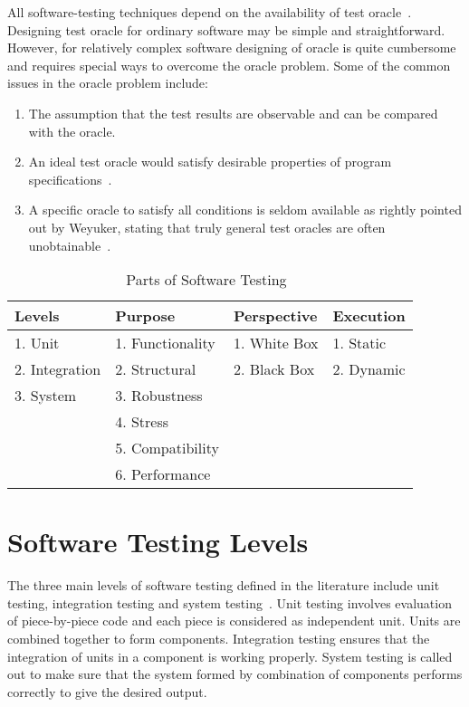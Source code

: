 {All software-testing techniques depend on the availability of test oracle~\cite{gaudel2010software}. Designing test oracle for ordinary software may be simple and straightforward. However, for relatively complex software designing of oracle is quite cumbersome and requires special ways to overcome the oracle problem. Some of the common issues in the oracle problem include:
\begin{enumerate}
\item The assumption that the test results are observable and can be compared with the oracle.
\item An ideal test oracle would satisfy desirable properties of program specifications~\cite{baresi2001test}.
\item A specific oracle to satisfy all conditions is seldom available as rightly pointed out by Weyuker, stating that truly general test oracles are often unobtainable~\cite{weyuker1982testing}. 
\end{enumerate}


\begin{table}[ht]
\caption{Parts of Software Testing~\cite{adrion1982validation, chilenski1994applicability, gaudel2010software, richardson1992specification, tracey1998automated}} %
\smallskip
\centering %
\begin{tabular}{| l | l | l | l | } %
\hline

Levels 					&Purpose		 				& Perspective			& Execution 	\\
\hline
1. Unit					&1. Functionality		& 1. White Box		& 1. Static 	\\
2. Integration	&2. Structural			& 2. Black Box		& 2. Dynamic	\\
3. System				&3. Robustness			& 								&			\\
								&4. Stress					&									&			\\
								&5. Compatibility		&									&			\\
								&6. Performance			&									&			\\



\hline %
\end{tabular}
\bigskip
\label{table:addvalues} %
\end{table}


\section{Software Testing Levels}
The three main levels of software testing defined in the literature include unit testing, integration testing and system testing~\cite{chilenski1994applicability}. Unit testing involves evaluation of piece-by-piece code and each piece is considered as independent unit. Units are combined together to form components. Integration testing ensures that the integration of units in a component is working properly. System testing is called out to make sure that the system formed by combination of components performs correctly to give the desired output.

}
